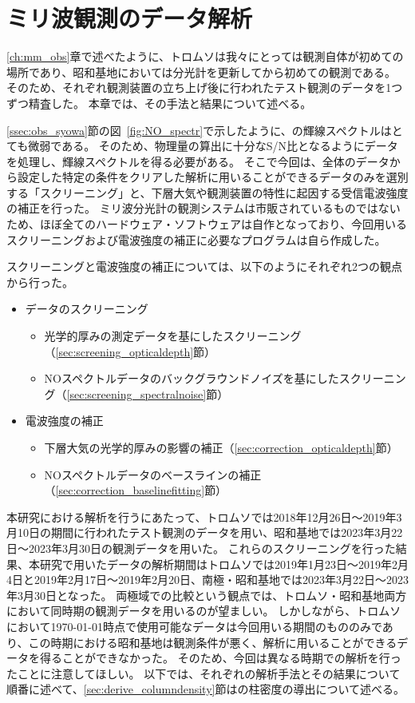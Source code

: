 \chapter{ミリ波観測のデータ解析}
\label{ch:mm_analysis}
\ref{ch:mm_obs}章で述べたように、トロムソは我々にとっては観測自体が初めての場所であり、昭和基地においては分光計を更新してから初めての観測である。
そのため、それぞれ観測装置の立ち上げ後に行われたテスト観測のデータを1つずつ精査した。
本章では、その手法と結果について述べる。\par

\ref{ssec:obs_syowa}節の図~\ref{fig:NO_spectr}で示したように、の輝線スペクトルはとても微弱である。
そのため、物理量の算出に十分なS/N比となるようにデータを処理し、輝線スペクトルを得る必要がある。
そこで今回は、全体のデータから設定した特定の条件をクリアした解析に用いることができるデータのみを選別する「スクリーニング」と、下層大気や観測装置の特性に起因する受信電波強度の補正を行った。
ミリ波分光計の観測システムは市販されているものではないため、ほぼ全てのハードウェア・ソフトウェアは自作となっており、今回用いるスクリーニングおよび電波強度の補正に必要なプログラムは自ら作成した。\par

スクリーニングと電波強度の補正については、以下のようにそれぞれ2つの観点から行った。
\begin{itemize}
    \item データのスクリーニング
    \begin{itemize}
        \item 光学的厚みの測定データを基にしたスクリーニング（\ref{sec:screening_opticaldepth}節）
        \item NOスペクトルデータのバックグラウンドノイズを基にしたスクリーニング（\ref{sec:screening_spectralnoise}節）
    \end{itemize}
    \item 電波強度の補正
    \begin{itemize}
        \item 下層大気の光学的厚みの影響の補正（\ref{sec:correction_opticaldepth}節）
        \item NOスペクトルデータのベースラインの補正（\ref{sec:correction_baselinefitting}節）
    \end{itemize}
\end{itemize} \par
本研究における解析を行うにあたって、トロムソでは2018年12月26日〜2019年3月10日の期間に行われたテスト観測のデータを用い、昭和基地では2023年3月22日〜2023年3月30日の観測データを用いた。
これらのスクリーニングを行った結果、本研究で用いたデータの解析期間はトロムソでは2019年1月23日〜2019年2月4日と2019年2月17日〜2019年2月20日、南極・昭和基地では2023年3月22日〜2023年3月30日となった。
両極域での比較という観点では、トロムソ・昭和基地両方において同時期の観測データを用いるのが望ましい。
しかしながら、トロムソにおいて\today 時点で使用可能なデータは今回用いる期間のもののみであり、この時期における昭和基地は観測条件が悪く、解析に用いることができるデータを得ることができなかった。
そのため、今回は異なる時期での解析を行ったことに注意してほしい。
以下では、それぞれの解析手法とその結果について順番に述べて、\ref{sec:derive_columndensity}節はの柱密度の導出について述べる。


